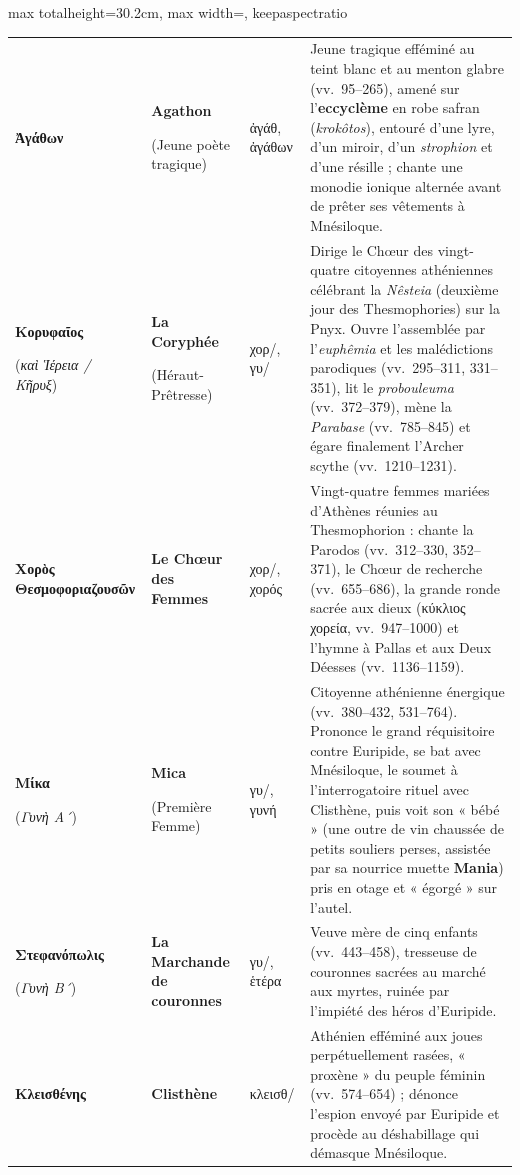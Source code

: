 \documentclass[11pt,twoside]{book}
\begin{document}
\begin{adjustbox}{max totalheight=30.2cm, max width=\textwidth, keepaspectratio}
\begin{minipage}{\textwidth}
{\begin{tabular*}{\textwidth}{@{\extracolsep{\fill}}p{3.3cm}p{3.5cm}p{2.2cm}p{10.9cm}@{}}
\textbf{Ἀγάθων} & \textbf{Agathon}\par (Jeune poète tragique) & ἀγάθ, ἀγάθων & Jeune tragique efféminé au teint blanc et au menton glabre (vv.~95–265), amené sur l'\textbf{eccyclème} en robe safran (\textit{krokôtos}), entouré d'une lyre, d'un miroir, d'un \textit{strophion} et d'une résille ; chante une monodie ionique alternée avant de prêter ses vêtements à Mnésiloque. \\
\textbf{Κορυφαῖος}\par (\textit{καὶ Ἱέρεια / Κῆρυξ}) & \textbf{La Coryphée}\par (Héraut-Prêtresse) & χορ/, γυ/ & Dirige le Chœur des vingt-quatre citoyennes athéniennes célébrant la \textit{Nêsteia} (deuxième jour des Thesmophories) sur la Pnyx. Ouvre l'assemblée par l'\textit{euphêmia} et les malédictions parodiques (vv.~295–311, 331–351), lit le \textit{probouleuma} (vv.~372–379), mène la \textit{Parabase} (vv.~785–845) et égare finalement l'Archer scythe (vv.~1210–1231). \\
\textbf{Χορὸς Θεσμοφοριαζουσῶν} & \textbf{Le Chœur des Femmes} & χορ/, χορός & Vingt-quatre femmes mariées d'Athènes réunies au Thesmophorion : chante la Parodos (vv.~312–330, 352–371), le Chœur de recherche (vv.~655–686), la grande ronde sacrée aux dieux (κύκλιος χορεία, vv.~947–1000) et l'hymne à Pallas et aux Deux Déesses (vv.~1136–1159). \\
\textbf{Μίκα}\par (\textit{Γυνὴ Α´}) & \textbf{Mica}\par (Première Femme) & γυ/, γυνή & Citoyenne athénienne énergique (vv.~380–432, 531–764). Prononce le grand réquisitoire contre Euripide, se bat avec Mnésiloque, le soumet à l'interrogatoire rituel avec Clisthène, puis voit son « bébé » (une outre de vin chaussée de petits souliers perses, assistée par sa nourrice muette \textbf{Mania}) pris en otage et « égorgé » sur l'autel. \\
\textbf{Στεφανόπωλις}\par (\textit{Γυνὴ Β´}) & \textbf{La Marchande de couronnes} & γυ/, ἑτέρα & Veuve mère de cinq enfants (vv.~443–458), tresseuse de couronnes sacrées au marché aux myrtes, ruinée par l'impiété des héros d'Euripide. \\
\textbf{Κλεισθένης} & \textbf{Clisthène} & κλεισθ/ & Athénien efféminé aux joues perpétuellement rasées, « proxène » du peuple féminin (vv.~574–654) ; dénonce l'espion envoyé par Euripide et procède au déshabillage qui démasque Mnésiloque. \\

\end{tabular*}}
\end{minipage}
\end{adjustbox}
\end{document}
